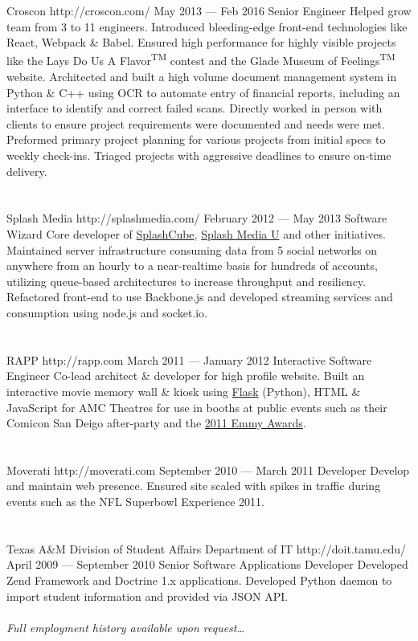 \documentclass{resume}
\begin{document}
\employer
	{Croscon}
	{http://croscon.com/}
	{May 2013 --- Feb 2016}
	{Senior Engineer}
	{Helped grow team from 3 to 11 engineers. Introduced bleeding-edge front-end technologies like React, Webpack \& Babel. Ensured high performance for highly visible projects like the Lays\textsuperscript{\textregistered} Do Us A Flavor\textsuperscript{TM} contest and the Glade\textsuperscript{\textregistered} Museum of Feelings\textsuperscript{TM} website. Architected and built a high volume document management system in Python \& C++ using OCR to automate entry of financial reports, including an interface to identify and correct failed scans. Directly worked in person with clients to ensure project requirements were documented and needs were met. Preformed primary project planning for various projects from initial specs to weekly check-ins. Triaged projects with aggressive deadlines to ensure on-time delivery.}
\\ \\ \\
\employer
	{Splash Media}
	{http://splashmedia.com/}
	{February 2012 --- May 2013}
	{Software Wizard}
	{Core developer of \href{http://splashcube.com/}{SplashCube}, \href{http://splashmediau.com/}{Splash Media U} and other initiatives. Maintained server infrastructure consuming data from 5 social networks on anywhere from an hourly to a near-realtime basis for hundreds of accounts, utilizing queue-based architectures to increase throughput and resiliency. Refactored front-end to use Backbone.js and developed streaming services and consumption using node.js and socket.io.}
\\ \\ \\
\employer
	{RAPP}
	{http://rapp.com}
	{March 2011 --- January 2012}
	{Interactive Software Engineer}
	{Co-lead architect \& developer for high profile website. Built an interactive movie memory wall \& kiosk using \href{http://flask.pocoo.org/}{Flask} (Python), HTML \& JavaScript for AMC Theatres for use in booths at public events such as their Comicon San Deigo after-party and the \href{http://www.accesshollywood.com/backstage-at-the-emmys/emmys-2011-backstage-at-the-hp-touchsmart-gift-lounge-day-1_gallerytab_3129/20}{2011 Emmy Awards}.}
\\ \\ \\
\employer
	{Moverati}
	{http://moverati.com}
	{September 2010 --- March 2011}
	{Developer}
	{Develop and maintain web presence. Ensured site scaled with spikes in traffic during events such as the NFL Superbowl Experience 2011.}
\\ \\ \\
\employer
	{Texas A\&M Division of Student Affairs Department of IT}
	{http://doit.tamu.edu/}
	{April 2009 --- September 2010}
	{Senior Software Applications Developer}
	{Developed Zend Framework and Doctrine 1.x applications. Developed Python daemon to import student information and provided via JSON API.}
\\ \\
\emph{Full employment history available upon request\ldots}
\end{document}
